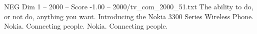 \begin{textsample}{NEG Dim 1 – 2000 – Score -1.00 – 2000/tv\_com\_2000\_51.txt}  \label{ex:f1_neg_027}
The ability to do, or not do, anything you want.
Introducing the Nokia 3300 Series Wireless Phone.
Nokia.
Connecting people.
Nokia.
Connecting people.

\end{textsample}
